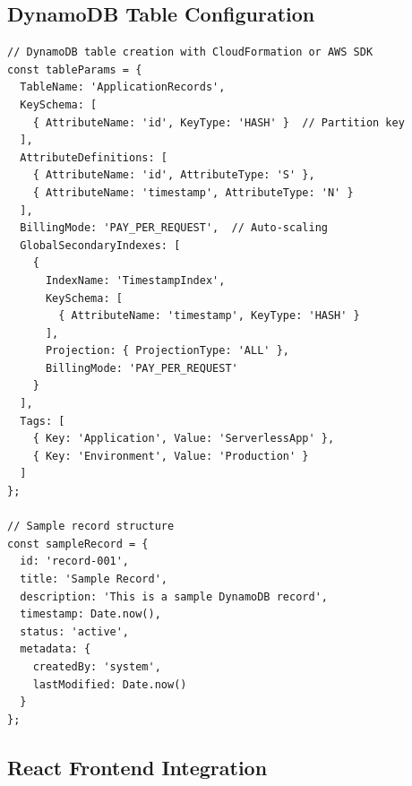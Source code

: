\subsection{DynamoDB Table Configuration}

\begin{lstlisting}[basicstyle=\ttfamily\small, caption=DynamoDB Table Schema Setup, captionpos=b]
// DynamoDB table creation with CloudFormation or AWS SDK
const tableParams = {
  TableName: 'ApplicationRecords',
  KeySchema: [
    { AttributeName: 'id', KeyType: 'HASH' }  // Partition key
  ],
  AttributeDefinitions: [
    { AttributeName: 'id', AttributeType: 'S' },
    { AttributeName: 'timestamp', AttributeType: 'N' }
  ],
  BillingMode: 'PAY_PER_REQUEST',  // Auto-scaling
  GlobalSecondaryIndexes: [
    {
      IndexName: 'TimestampIndex',
      KeySchema: [
        { AttributeName: 'timestamp', KeyType: 'HASH' }
      ],
      Projection: { ProjectionType: 'ALL' },
      BillingMode: 'PAY_PER_REQUEST'
    }
  ],
  Tags: [
    { Key: 'Application', Value: 'ServerlessApp' },
    { Key: 'Environment', Value: 'Production' }
  ]
};

// Sample record structure
const sampleRecord = {
  id: 'record-001',
  title: 'Sample Record',
  description: 'This is a sample DynamoDB record',
  timestamp: Date.now(),
  status: 'active',
  metadata: {
    createdBy: 'system',
    lastModified: Date.now()
  }
};
\end{lstlisting}

\subsection{React Frontend Integration}

